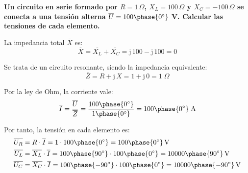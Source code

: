 	\vspace{4mm}
	\begin{example}\label{ej.2-4}
		\textbf{Un circuito en serie formado por $R=1\,\Omega$, ${X_L}=100\,\Omega$ y ${X_C}=-100\,\Omega$ se conecta a una tensión alterna $\overline{U}=100\phase{0^\circ}$ V. Calcular las tensiones de cada elemento.}
		
		La impedancia total $\overline{X}$ es:
		\begin{equation*}
			\overline{X}= \overline{X_L}+\overline{X_C}=\mathrm{j}\,100-\mathrm{j}\,100=0
		\end{equation*}
		
		Se trata de un circuito resonante, siendo la impedancia equivalente:
		\begin{equation*}
			\overline{Z}=R+\mathrm{j}\,X=1+\mathrm{j}\,0=1\;\Omega
		\end{equation*}
		
		Por la ley de Ohm, la corriente vale:
		\begin{equation*}
			\overline{I}=\dfrac{\overline{U}}{\overline{Z}}=\dfrac{100\phase{0^\circ}}{1\phase{0^\circ}}=100\phase{0^\circ}\;\text{A}
		\end{equation*}
		
		Por tanto, la tensión en cada elemento es: 
		\begin{align*}
			\overline{U_R}&=R\cdot\overline{I}=1\cdot 100\phase{0^\circ}=100\phase{0^\circ}\,\text{V}\\
			\overline{U_L}&=\overline{X_L}\cdot\overline{I}=100\phase{90^\circ}\cdot 100\phase{0^\circ}=10000\phase{90^\circ}\,\text{V}\\
			\overline{U_C}&=\overline{X_C}\cdot\overline{I}=100\phase{-90^\circ}\cdot 100\phase{0^\circ}=10000\phase{-90^\circ}\,\text{V}
		\end{align*}
	\end{example}
	
	
